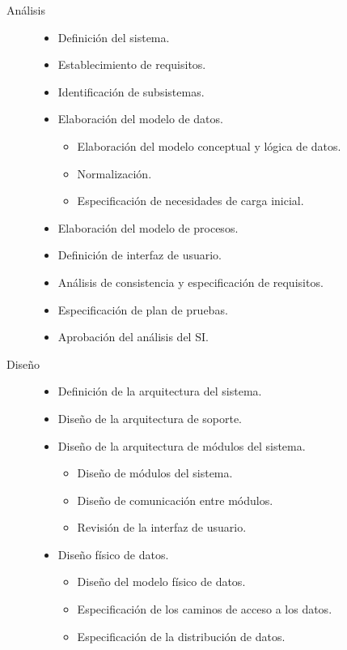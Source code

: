 \documentclass[11pt,a4paper,spanish,twoside]{report}
\begin{document}
\begin{description}
\item[Análisis] \hfill
  \begin{itemize}
  \item Definición del sistema.
  \item Establecimiento de requisitos.
  \item Identificación de subsistemas.
  \item Elaboración del modelo de datos.
    \begin{itemize}
    \item Elaboración del modelo conceptual y lógica de datos.
    \item Normalización.
    \item Especificación de necesidades de carga inicial.
    \end{itemize}
  \item Elaboración del modelo de procesos.
  \item Definición de interfaz de usuario.
  \item Análisis de consistencia y especificación de requisitos.
  \item Especificación de plan de pruebas.
  \item Aprobación del análisis del SI.
  \end{itemize}
\item[Diseño] \hfill
  \begin{itemize}
  \item Definición de la arquitectura del sistema.
  \item Diseño de la arquitectura de soporte.
  \item Diseño de la arquitectura de módulos del sistema.
    \begin{itemize}
    \item Diseño de módulos del sistema.
    \item Diseño de comunicación entre módulos.
    \item Revisión de la interfaz de usuario.
    \end{itemize}
  \item Diseño físico de datos.
    \begin{itemize}
    \item Diseño del modelo físico de datos.
    \item Especificación de los caminos de acceso a los datos.
    \item Especificación de la distribución de datos.
    \end{itemize}

\end{itemize}
\end{description}
\end{document}
